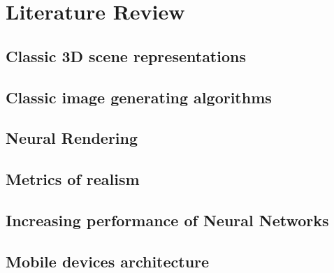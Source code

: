 \chapter{Literature Review}\label{chapter:lit}

\section{Classic 3D scene representations}
\label{lit:classic-repr}

\section{Classic image generating algorithms}
\label{lit:classic-algo}

\section{Neural Rendering}
\label{lit:nrender}

\section{Metrics of realism}
\label{lit:metrics}

\section{Increasing performance of Neural Networks}
\label{lit:dnn-speedup}

\section{Mobile devices architecture}
\label{lit:mobile}